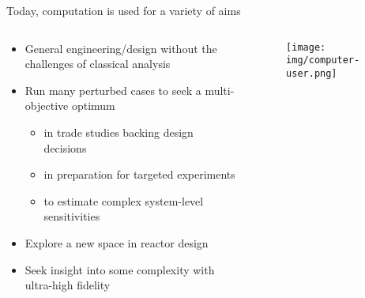 \documentclass[pdf,aspectratio=169]{beamer}
\begin{document}
\begin{frame}{Today, computation is used for a variety of aims}
\begin{columns}
    \begin{column}{0.7\textwidth}
        \begin{itemize}
            \item General engineering/design without the challenges of classical analysis
            \item Run many perturbed cases to seek a multi-objective optimum
            \begin{itemize}
                \item in trade studies backing design decisions
                \item in preparation for targeted experiments 
                \item to estimate complex system-level sensitivities
            \end{itemize}
            \item Explore a new space in reactor design
            \item Seek insight into some complexity with ultra-high fidelity
        \end{itemize}
    \end{column}
    \begin{column}{0.3\textwidth}
        \begin{figure}[ht]
        \centering
            \texttt{[image: img/computer-user.png]}
        \end{figure}
    \end{column}
\end{columns}
\end{frame}
\end{document}
